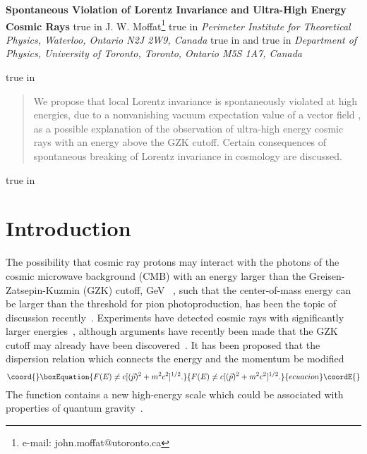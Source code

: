 \documentclass[a4paper,12pt]{article}
\begin{document}
\pagestyle{plain}
\setcounter{page}{1}
\begin{center}
{\large \textbf{Spontaneous Violation of Lorentz Invariance and
Ultra-High Energy Cosmic Rays}}
 true in
{\large J. W. Moffat}\footnote{e-mail: john.moffat@utoronto.ca}
 true in
\textit{Perimeter Institute for
Theoretical Physics, Waterloo, Ontario N2J 2W9, Canada}
 true in
and
 true in
\textit{Department of Physics, University of
Toronto, Toronto, Ontario M5S 1A7, Canada}

 true in
\begin{abstract}
We propose that local Lorentz invariance is spontaneously
violated at high energies, due to a nonvanishing vacuum expectation value of a
vector field \myHighlight{$\phi^\mu$}\coordHE{}, as a possible explanation of the observation of ultra-high
energy cosmic rays with an energy above the GZK cutoff. Certain consequences of
spontaneous breaking of Lorentz invariance in cosmology are discussed.
\end{abstract}
 true in \end{center}

\date{\today}

\section{\bf Introduction}

The possibility that cosmic ray protons may interact with the
photons of the cosmic microwave background (CMB) with an energy
larger than the Greisen-Zatsepin-Kuzmin (GZK) cutoff, \coordHE{} GeV
~\cite{Zatsepin}, such that the center-of-mass energy can be larger than the
threshold for pion photoproduction, has been the topic of discussion
recently~\cite{Camelia,Piran,Glashow,Camelia2,Smolin,Toller}.
Experiments have detected cosmic rays with significantly larger
energies~\cite{Takeda,Stecker}, although arguments have recently been made that the
GZK cutoff may already have been discovered~\cite{Bahcall}. It has been proposed
that the dispersion relation which connects the energy \coordHE{} and the momentum
\coordHE{} be modified
\begin{equation}\coord{}\boxEquation{
\label{dispersion}
F(E)\not= c[({\vec p})^2+m^2c^2]^{1/2}.
}{
F(E)\not= c[({\vec p})^2+m^2c^2]^{1/2}.
}{ecuacion}\coordE{}\end{equation}
The function \coordHE{} contains a new high-energy scale which could be
associated with properties of quantum gravity~\cite{Camelia,Smolin,Kifune,Majid}.
\end{document}
